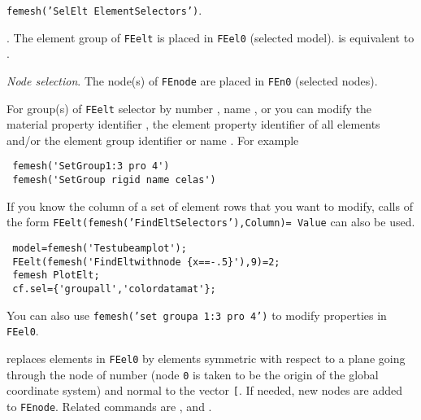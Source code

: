 {\tt femesh('SelElt  {\ti ElementSelectors}')}.


. The element group  of {\tt FEelt} is placed in {\tt FEel0} (selected model).  is equivalent to .

{\sl Node selection}. The node(s)  of {\tt FEnode} are placed in {\tt FEn0} (selected nodes). 


 For group(s) of {\tt FEelt} selector by number , name , or  you can modify the material property identifier , the element property identifier  of all elements and/or the element group identifier  or name . For example

\begin{verbatim}
 femesh('SetGroup1:3 pro 4')
 femesh('SetGroup rigid name celas') 
\end{verbatim}


If you know the column of a set of element rows that you want to modify, calls of the form {\tt FEelt(femesh('FindElt{\ti Selectors}'),{\ti Column})= {\ti Value}} can also be used.

\begin{verbatim}
 model=femesh('Testubeamplot');
 FEelt(femesh('FindEltwithnode {x==-.5}'),9)=2;
 femesh PlotElt; 
 cf.sel={'groupall','colordatamat'};
\end{verbatim}%


You can also use {\tt femesh('set groupa 1:3 pro 4')} to modify properties in {\tt FEel0}.


 replaces elements in {\tt FEel0} by elements symmetric with respect to a plane going through the node of number  (node {\tt 0} is taken to be the origin of the global coordinate system) and normal to the vector {\tt [}\tsi{nx ny nz}{\tt ]}. If needed, new nodes are added to {\tt FEnode}.  
Related commands are ,  and .

